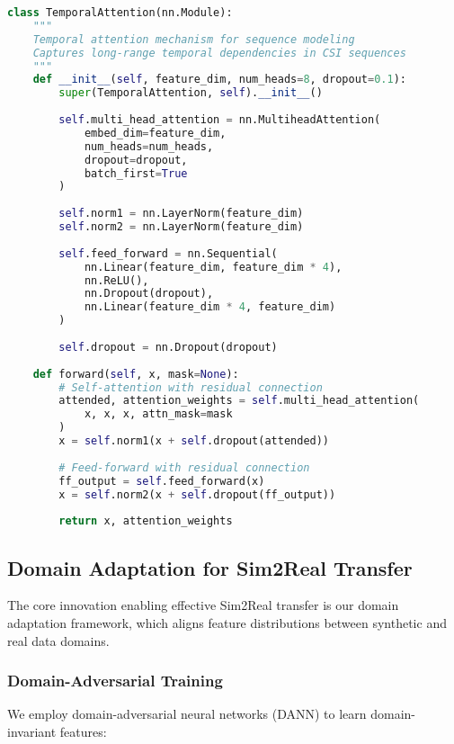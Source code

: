 \documentclass[journal]{IEEEtran}
\begin{document}
\begin{lstlisting}[language=Python, caption=Temporal Attention Implementation]
class TemporalAttention(nn.Module):
    """
    Temporal attention mechanism for sequence modeling
    Captures long-range temporal dependencies in CSI sequences
    """
    def __init__(self, feature_dim, num_heads=8, dropout=0.1):
        super(TemporalAttention, self).__init__()
        
        self.multi_head_attention = nn.MultiheadAttention(
            embed_dim=feature_dim,
            num_heads=num_heads,
            dropout=dropout,
            batch_first=True
        )
        
        self.norm1 = nn.LayerNorm(feature_dim)
        self.norm2 = nn.LayerNorm(feature_dim)
        
        self.feed_forward = nn.Sequential(
            nn.Linear(feature_dim, feature_dim * 4),
            nn.ReLU(),
            nn.Dropout(dropout),
            nn.Linear(feature_dim * 4, feature_dim)
        )
        
        self.dropout = nn.Dropout(dropout)
        
    def forward(self, x, mask=None):
        # Self-attention with residual connection
        attended, attention_weights = self.multi_head_attention(
            x, x, x, attn_mask=mask
        )
        x = self.norm1(x + self.dropout(attended))
        
        # Feed-forward with residual connection
        ff_output = self.feed_forward(x)
        x = self.norm2(x + self.dropout(ff_output))
        
        return x, attention_weights
\end{lstlisting}

\subsection{Domain Adaptation for Sim2Real Transfer}

The core innovation enabling effective Sim2Real transfer is our domain adaptation framework, which aligns feature distributions between synthetic and real data domains.

\subsubsection{Domain-Adversarial Training}

We employ domain-adversarial neural networks (DANN) to learn domain-invariant features:
\end{document}
